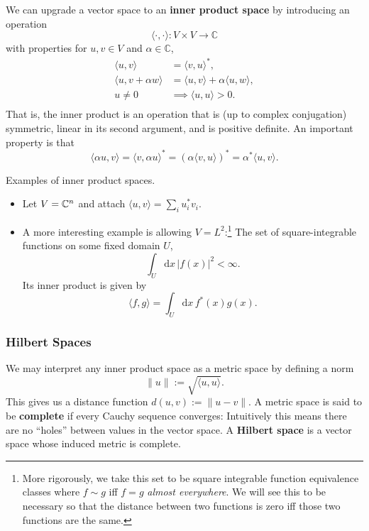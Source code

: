 We can upgrade a vector space to an \textbf{inner product space} by introducing an operation $$\langle \cdot, \cdot \rangle : V\times V \to \mathbb{C}$$
with properties for $u, v\in V$ and $\alpha \in\mathbb{C}$,
\begin{align*}
    \langle u, v\rangle &= \langle v, u\rangle^*, \\
    \langle u, v + \alpha w \rangle & = \langle u, v \rangle + \alpha \langle u, w \rangle, \\
    u \neq 0 &\implies \langle u, u \rangle > 0. \\
\end{align*}
That is, the inner product is an operation that is (up to complex conjugation) symmetric, linear in its second argument, and is positive definite. An important property is that
$$\langle \alpha u, v \rangle = \langle v, \alpha u \rangle^* = (\alpha \langle v,  u \rangle)^* = \alpha^* \langle u, v\rangle.$$
\begin{example} Examples of inner product spaces.
    \begin{itemize}
        \item Let $V = \mathbb{C}^n$ and attach $\langle u, v \rangle = \sum_{i} u_i^* v_i$.
        \item A more interesting example is allowing $V = L^2$:\footnote{
            More rigorously, we take this set to be square integrable function equivalence classes where $f\sim g$ iff $f=g$ \emph{almost everywhere}. We will see this to be necessary so that the distance between two functions is zero iff those two functions are the same.
        } The set of square-integrable functions on some fixed domain $U$,
        $$\int_U\mathrm d x\,|f(x)|^2 < \infty.$$
        Its inner product is given by
        $$\langle f, g \rangle = \int_U \mathrm d x\, f^*(x) g(x).$$
    \end{itemize}
\end{example}

\subsubsection{Hilbert Spaces}
We may interpret any inner product space as a metric space by defining a norm
$$\|u\| := \sqrt{\langle u, u \rangle}.$$ This gives us a distance function $d(u, v) := \|u - v\|$. A metric space is said to be \textbf{complete} if every Cauchy sequence converges: Intuitively this means there are no ``holes'' between values in the vector space. A \textbf{Hilbert space} is a vector space whose induced metric is complete.

